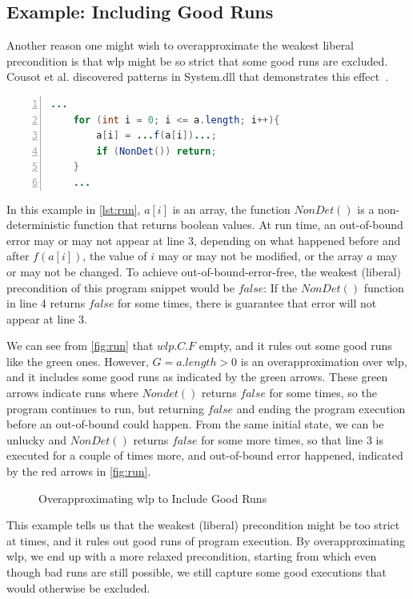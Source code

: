 \subsection{Example: Including Good Runs}
Another reason one might wish to overapproximate the weakest liberal precondition is that wlp might be so strict that some good runs are excluded. 
Cousot et al. discovered patterns in System.dll that demonstrates this effect~\cite{cousot13}. 
\begin{lstlisting}[caption={Good Runs Excluded}, label={lst:run}, language=java, numbers=left, stepnumber=1, captionpos=b,escapechar=|,frame=single]
	... 
	for (int i = 0; i <= a.length; i++){
		a[i] = ...f(a[i])...; 
		if (NonDet()) return; 
	}
	...
\end{lstlisting}
In this example in \autoref{lst:run}, $a[i]$ is an array, the function $NonDet()$ is a non-deterministic function that returns boolean values. 
At run time, an out-of-bound error may or may not appear at line 3, depending on what happened before and after $f(a[i])$, the value of $i$ may or may not be modified, or the array $a$ may or may not be changed. 
To achieve out-of-bound-error-free, the weakest (liberal) precondition of this program snippet would be $false$: 
If the $NonDet()$ function in line 4 returns $false$ for some times, there is   guarantee that error will not appear at line 3. 

We can see from \autoref{fig:run} that $wlp.C.F$ empty, and it rules out some good runs like the green ones. 
However, $G=a.length>0$ is an overapproximation over wlp, and it includes some good runs as indicated by the green arrows. 
These green arrows indicate runs where $Nondet()$ returns $false$ for some times, so the program continues to run, but returning $false$ and ending the program execution before an out-of-bound could happen. 
From the same initial state, we can be unlucky and $NonDet()$ returns $false$ for some more times, so that line 3 is executed for a couple of times more, and out-of-bound error happened, indicated by the red arrows in \autoref{fig:run}.

\begin{figure}[ht]
	\centering
	
	\caption{Overapproximating wlp to Include Good Runs}
	\label{fig:run} 
\end{figure}

This example tells us that the weakest (liberal) precondition might be too strict at times, and it rules out good runs of program execution. 
By overapproximating wlp, we end up with a more relaxed precondition, starting from which even though bad runs are still possible, we still capture some good executions that would otherwise be excluded. 




